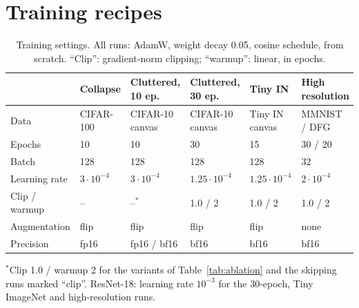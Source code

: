 \documentclass[10pt]{article}
\begin{document}
\section{Training recipes}
\label{app:recipes}
\begin{table}[h]
\centering
\caption{Training settings. All runs: AdamW, weight decay 0.05, cosine schedule, from scratch.
``Clip'': gradient-norm clipping; ``warmup'': linear, in epochs.}
\begin{tabular}{llllll}
\toprule
& Collapse & Cluttered, 10 ep. & Cluttered, 30 ep. & Tiny IN & High resolution \\
\midrule
Data & CIFAR-100 & CIFAR-10 canvas & CIFAR-10 canvas & Tiny IN canvas & MMNIST / DFG \\
Epochs & 10 & 10 & 30 & 15 & 30 / 20 \\
Batch & 128 & 128 & 128 & 128 & 32 \\
Learning rate & $3\cdot10^{-4}$ & $3\cdot10^{-4}$ & $1.25\cdot10^{-4}$ & $1.25\cdot10^{-4}$ & $2\cdot10^{-4}$ \\
Clip / warmup & -- & --$^{\ast}$ & 1.0 / 2 & 1.0 / 2 & 1.0 / 2 \\
Augmentation & flip & flip & flip & flip & none \\
Precision & fp16 & fp16 / bf16 & bf16 & bf16 & bf16 \\
\bottomrule
\end{tabular}

\smallskip
{\raggedright\footnotesize $^{\ast}$Clip 1.0 / warmup 2 for the variants of Table~\ref{tab:ablation} and the
skipping runs marked ``clip''. ResNet-18: learning rate $10^{-3}$ for the 30-epoch, Tiny ImageNet
and high-resolution runs.\par}
\end{table}
\end{document}
